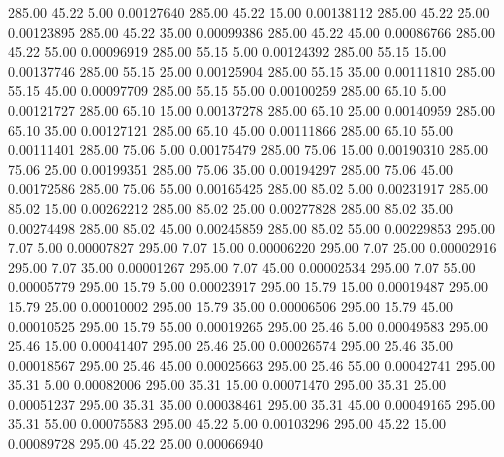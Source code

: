     285.00     45.22      5.00     0.00127640
    285.00     45.22     15.00     0.00138112
    285.00     45.22     25.00     0.00123895
    285.00     45.22     35.00     0.00099386
    285.00     45.22     45.00     0.00086766
    285.00     45.22     55.00     0.00096919
    285.00     55.15      5.00     0.00124392
    285.00     55.15     15.00     0.00137746
    285.00     55.15     25.00     0.00125904
    285.00     55.15     35.00     0.00111810
    285.00     55.15     45.00     0.00097709
    285.00     55.15     55.00     0.00100259
    285.00     65.10      5.00     0.00121727
    285.00     65.10     15.00     0.00137278
    285.00     65.10     25.00     0.00140959
    285.00     65.10     35.00     0.00127121
    285.00     65.10     45.00     0.00111866
    285.00     65.10     55.00     0.00111401
    285.00     75.06      5.00     0.00175479
    285.00     75.06     15.00     0.00190310
    285.00     75.06     25.00     0.00199351
    285.00     75.06     35.00     0.00194297
    285.00     75.06     45.00     0.00172586
    285.00     75.06     55.00     0.00165425
    285.00     85.02      5.00     0.00231917
    285.00     85.02     15.00     0.00262212
    285.00     85.02     25.00     0.00277828
    285.00     85.02     35.00     0.00274498
    285.00     85.02     45.00     0.00245859
    285.00     85.02     55.00     0.00229853
    295.00      7.07      5.00     0.00007827
    295.00      7.07     15.00     0.00006220
    295.00      7.07     25.00     0.00002916
    295.00      7.07     35.00     0.00001267
    295.00      7.07     45.00     0.00002534
    295.00      7.07     55.00     0.00005779
    295.00     15.79      5.00     0.00023917
    295.00     15.79     15.00     0.00019487
    295.00     15.79     25.00     0.00010002
    295.00     15.79     35.00     0.00006506
    295.00     15.79     45.00     0.00010525
    295.00     15.79     55.00     0.00019265
    295.00     25.46      5.00     0.00049583
    295.00     25.46     15.00     0.00041407
    295.00     25.46     25.00     0.00026574
    295.00     25.46     35.00     0.00018567
    295.00     25.46     45.00     0.00025663
    295.00     25.46     55.00     0.00042741
    295.00     35.31      5.00     0.00082006
    295.00     35.31     15.00     0.00071470
    295.00     35.31     25.00     0.00051237
    295.00     35.31     35.00     0.00038461
    295.00     35.31     45.00     0.00049165
    295.00     35.31     55.00     0.00075583
    295.00     45.22      5.00     0.00103296
    295.00     45.22     15.00     0.00089728
    295.00     45.22     25.00     0.00066940
